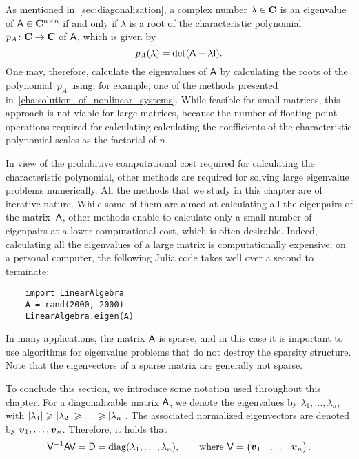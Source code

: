 As mentioned in~\cref{sec:diagonalization},
a complex number $\lambda \in \mathbf C$ is an eigenvalue of $\mathsf A \in \mathbf C^{n \times n}$
if and only if $\lambda$ is a root of the characteristic polynomial $p_A \colon \mathbf C \to \mathbf C$ of $\mathsf A$,
which is given by
\[
    p_A(\lambda) = \det (\mathsf A - \lambda \mathsf I).
\]
One may,
therefore,
calculate the eigenvalues of $\mathsf A$ by calculating the roots of the polynomial~$p_A$ using,
for example, one of the methods presented in~\cref{cha:solution_of_nonlinear_systems}.
While feasible for small matrices,
this approach is not viable for large matrices,
because the number of floating point operations required for calculating calculating the coefficients of the characteristic polynomial scales as the factorial of $n$.

In view of the prohibitive computational cost required for calculating the characteristic polynomial,
other methods are required for solving large eigenvalue problems numerically.
All the methods that we study in this chapter are of iterative nature.
While some of them are aimed at calculating all the eigenpairs of the matrix~$\mathsf A$,
other methods enable to calculate only a small number of eigenpairs at a lower computational cost,
which is often desirable.
Indeed, calculating all the eigenvalues of a large matrix is computationally expensive;
on a personal computer, the following Julia code takes well over a second to terminate:
\begin{verbatim}
    import LinearAlgebra
    A = rand(2000, 2000)
    LinearAlgebra.eigen(A)
\end{verbatim}

In many applications,
the matrix $\mathsf A$ is sparse,
and in this case it is important to use algorithms for eigenvalue problems that do not destroy the sparsity structure.
Note that the eigenvectors of a sparse matrix are generally not sparse.

To conclude this section,
we introduce some notation used throughout this chapter.
For a diagonalizable matrix $\mathsf A$,
we denote the eigenvalues by $\lambda_1, \dotsc, \lambda_n$,
with $\lvert\lambda_1\rvert \geqslant \lvert\lambda_2\rvert \geqslant \dotsc \geqslant \lvert\lambda_n\rvert$.
The associated normalized eigenvectors are denoted by $\mathbf{\boldsymbol{v}}_1, \dotsc, \mathbf{\boldsymbol{v}}_n$.
Therefore, it holds that
\[
    \mathsf V^{-1} \mathsf A \mathsf V = \mathsf D = \operatorname{diag}(\lambda_1, \dotsc, \lambda_n),
    \qquad \text{where } \mathsf V = \begin{pmatrix} \mathbf{\boldsymbol{v}}_1 & \hdots & \mathbf{\boldsymbol{v}}_n \end{pmatrix}.
\]

